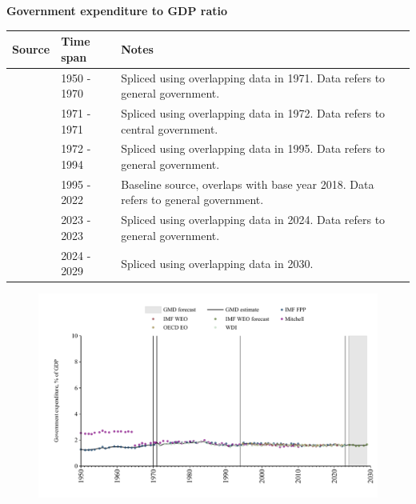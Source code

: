 \documentclass[12pt,a4paper,landscape]{article}
\begin{document}
\begin{adjustbox}{max totalsize={\paperwidth}{\paperheight},center}
\begin{minipage}[t][\textheight][t]{\textwidth}
\vspace*{0.5cm}
{}
\begin{center}
{\Large\bfseries Government expenditure to GDP ratio}
\end{center}
\vspace{0.5cm}
\begin{table}[H]
\centering
\small
\begin{tabular}{|l|l|l|}
\hline
\textbf{Source} & \textbf{Time span} & \textbf{Notes} \\
\hline
\rowcolor{white}\cite{IMF_FPP}& 1950 - 1970 &Spliced using overlapping data in 1971. Data refers to general government.\\
\rowcolor{lightgray}\cite{Mitchell}& 1971 - 1971 &Spliced using overlapping data in 1972. Data refers to central government.\\
\rowcolor{white}\cite{WDI}& 1972 - 1994 &Spliced using overlapping data in 1995. Data refers to general government.\\
\rowcolor{lightgray}\cite{OECD_EO}& 1995 - 2022 &Baseline source, overlaps with base year 2018. Data refers to general government.\\
\rowcolor{white}\cite{WDI}& 2023 - 2023 &Spliced using overlapping data in 2024. Data refers to general government.\\
\rowcolor{lightgray}\cite{IMF_WEO_forecast}& 2024 - 2029 &Spliced using overlapping data in 2030. \\
\hline
\end{tabular}
\end{table}
\begin{figure}[H]
\centering
\includegraphics[width=\textwidth,height=0.6\textheight,keepaspectratio]{graphs/ISR_govexp_GDP.pdf}
\end{figure}
\end{minipage}
\end{adjustbox}
\end{document}
